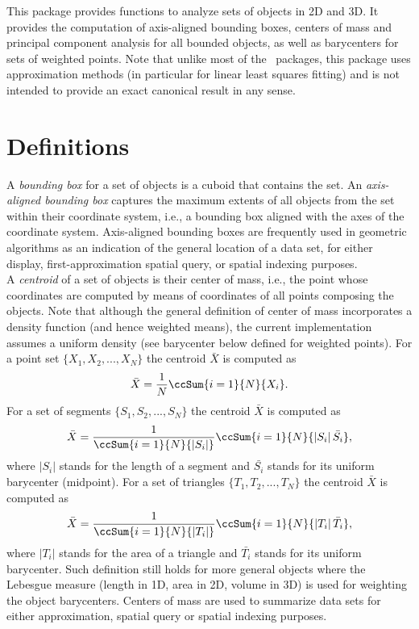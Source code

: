 This package provides functions to analyze sets of objects in 2D and 3D. It provides the computation of axis-aligned bounding boxes, centers of mass and principal component analysis for all bounded objects, as well as barycenters for sets of weighted points. Note that unlike most of the \cgal\ packages, this package uses approximation methods (in particular for linear least squares fitting) and is not intended to provide an exact canonical result in any sense. 

\section{Definitions}

A \emph{bounding box} for a set of objects is a cuboid that contains the set. An \emph{axis-aligned bounding box} captures the maximum extents of all objects from the set within their coordinate system, i.e., a bounding box aligned with the axes of the coordinate system. Axis-aligned bounding boxes are frequently used in geometric algorithms as an indication of the general location of a data set, for either display, first-approximation spatial query, or spatial indexing purposes. \\

A \emph{centroid} of a set of objects is their center of mass, i.e., the point whose coordinates are computed by means of coordinates of all points composing the objects. Note that although the general definition of center of mass incorporates a density function (and hence weighted means), the current implementation assumes a uniform density (see barycenter below defined for weighted points). For a point set $\{X_1,X_2,...,X_N\}$ the centroid $\bar{X}$ is computed as $$\bar{X} = \frac{1}{N} \ccSum{i=1}{N}{ X_i}.$$ For a set of segments $\{S_1,S_2,...,S_N\}$ the centroid $\bar{X}$ is computed as $$\bar{X} = \frac{1}{\ccSum{i=1}{N}{\left|S_i\right|}} \ccSum{i=1}{N}{ \left|S_i\right| \bar{S_i}},$$ where $\left|S_i\right|$ stands for the length of a segment and $\bar{S_i}$ stands for its uniform barycenter (midpoint). For a set of triangles $\{T_1,T_2,...,T_N\}$ the centroid $\bar{X}$ is computed as $$\bar{X} = \frac{1}{\ccSum{i=1}{N}{\left|T_i\right|}} \ccSum{i=1}{N}{ \left|T_i\right| \bar{T_i}},$$ where $\left|T_i\right|$ stands for the area of a triangle and $\bar{T_i}$ stands for its uniform barycenter. Such definition still holds for more general objects where the Lebesgue measure (length in 1D, area in 2D, volume in 3D) is used for weighting the object barycenters. Centers of mass are used to summarize data sets for either approximation, spatial query or spatial indexing purposes.\\

